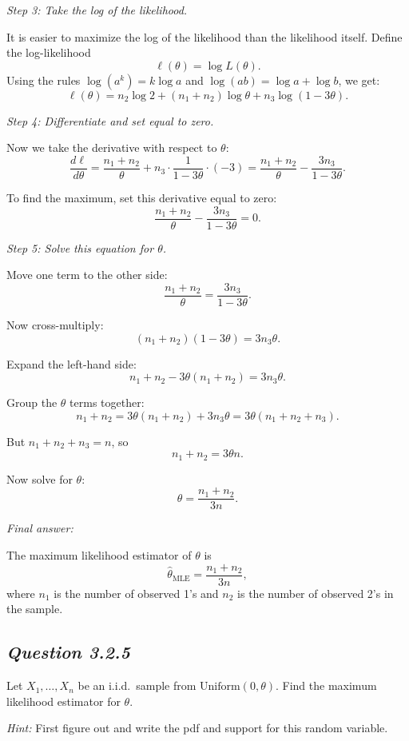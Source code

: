\documentclass[11pt,letterpaper]{article}
\theoremstyle{remark}
\begin{document}
\medskip
\textit{Step 3: Take the log of the likelihood.}

It is easier to maximize the log of the likelihood than the likelihood itself. Define the log-likelihood
\[
\ell(\theta) = \log L(\theta).
\]
Using the rules $\log(a^k) = k \log a$ and $\log(ab) = \log a + \log b$, we get:
\[
\ell(\theta)
= n_2 \log 2 + (n_1 + n_2)\log \theta + n_3 \log(1 - 3\theta).
\]

\medskip
\textit{Step 4: Differentiate and set equal to zero.}

Now we take the derivative with respect to $\theta$:
\[
\frac{d\ell}{d\theta}
= \frac{n_1 + n_2}{\theta}
  + n_3 \cdot \frac{1}{1 - 3\theta} \cdot (-3)
= \frac{n_1 + n_2}{\theta} - \frac{3n_3}{1 - 3\theta}.
\]

To find the maximum, set this derivative equal to zero:
\[
\frac{n_1 + n_2}{\theta} - \frac{3n_3}{1 - 3\theta} = 0.
\]

\medskip
\textit{Step 5: Solve this equation for $\theta$.}

Move one term to the other side:
\[
\frac{n_1 + n_2}{\theta} = \frac{3n_3}{1 - 3\theta}.
\]

Now cross-multiply:
\[
(n_1 + n_2)(1 - 3\theta) = 3n_3 \theta.
\]

Expand the left-hand side:
\[
n_1 + n_2 - 3\theta(n_1 + n_2) = 3n_3 \theta.
\]

Group the $\theta$ terms together:
\[
n_1 + n_2 = 3\theta(n_1 + n_2) + 3n_3 \theta
= 3\theta(n_1 + n_2 + n_3).
\]

But $n_1 + n_2 + n_3 = n$, so
\[
n_1 + n_2 = 3\theta n.
\]

Now solve for $\theta$:
\[
\theta = \frac{n_1 + n_2}{3n}.
\]

\medskip
\textit{Final answer:}

The maximum likelihood estimator of $\theta$ is
\[
\boxed{\hat{\theta}_{\mathrm{MLE}} = \frac{n_1 + n_2}{3n}},
\]
where $n_1$ is the number of observed 1's and $n_2$ is the number of observed 2's in the sample.

\newpage

\subsection*{\textbf{\textit{Question 3.2.5}}}

Let $X_1, \ldots, X_n$ be an i.i.d.\ sample from $\mathrm{Uniform}(0,\theta)$. Find the maximum likelihood estimator for $\theta$.

\noindent\textit{Hint:} First figure out and write the pdf and support for this random variable.
\end{document}
